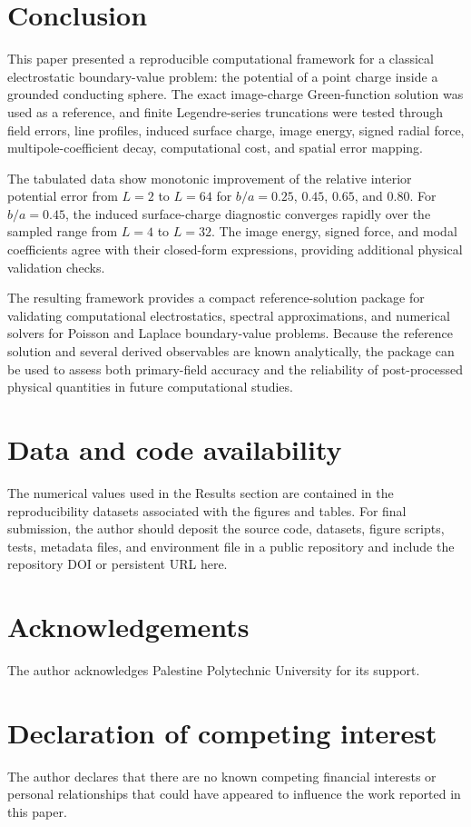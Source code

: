 \documentclass[preprint,12pt]{elsarticle}
\begin{document}
\section{Conclusion}

This paper presented a reproducible computational framework for a classical electrostatic boundary-value problem: the potential of a point charge inside a grounded conducting sphere. The exact image-charge Green-function solution was used as a reference, and finite Legendre-series truncations were tested through field errors, line profiles, induced surface charge, image energy, signed radial force, multipole-coefficient decay, computational cost, and spatial error mapping.

The tabulated data show monotonic improvement of the relative interior potential error from $L=2$ to $L=64$ for $b/a=0.25$, $0.45$, $0.65$, and $0.80$. For $b/a=0.45$, the induced surface-charge diagnostic converges rapidly over the sampled range from $L=4$ to $L=32$. The image energy, signed force, and modal coefficients agree with their closed-form expressions, providing additional physical validation checks.

The resulting framework provides a compact reference-solution package for validating computational electrostatics, spectral approximations, and numerical solvers for Poisson and Laplace boundary-value problems. Because the reference solution and several derived observables are known analytically, the package can be used to assess both primary-field accuracy and the reliability of post-processed physical quantities in future computational studies.

\section*{Data and code availability}
The numerical values used in the Results section are contained in the reproducibility datasets associated with the figures and tables. For final submission, the author should deposit the source code, datasets, figure scripts, tests, metadata files, and environment file in a public repository and include the repository DOI or persistent URL here.

\section*{Acknowledgements}
The author acknowledges Palestine Polytechnic University for its support.

\section*{Declaration of competing interest}
The author declares that there are no known competing financial interests or personal relationships that could have appeared to influence the work reported in this paper.
\end{document}
